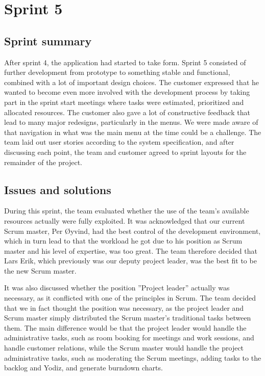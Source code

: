 \section{Sprint 5}
\subsection{Sprint summary}
After sprint 4, the application had started to take form. Sprint 5 consisted of further development from prototype to something stable and functional, combined with a lot of important design choices. The customer expressed that he wanted to become even more involved with the development process by taking part in the sprint start meetings where tasks were estimated, prioritized and allocated resources. The customer also gave a lot of constructive feedback that lead to many major redesigns, particularly in the menus. We were made aware of that navigation in what was the main menu at the time could be a challenge. The team laid out user stories according to the system specification, and after discussing each point, the team and customer agreed to sprint layouts for the remainder of the project.




\subsection{Issues and solutions}
\label{sec:unbalancedWorkload}
During this sprint, the team evaluated whether the use of the team's available resources actually were fully exploited. It was acknowledged that our current Scrum master, Per Øyvind, had the best control of the development environment, which in turn lead to that the workload he got due to his position as Scrum master and his level of expertise, was too great. The team therefore decided that Lars Erik, which previously was our deputy project leader, was the best fit to be the new Scrum master.

It was also discussed whether the position ''Project leader'' actually was necessary, as it conflicted with one of the principles in Scrum. The team decided that we in fact thought the position was necessary, as the project leader and Scrum master simply distributed the Scrum master's traditional tasks between them. The main difference would be that the project leader would handle the administrative tasks, such as room booking for meetings and work sessions, and handle customer relations, while the Scrum master would handle the project administrative tasks, such as moderating the Scrum meetings, adding tasks to the backlog and Yodiz, and generate burndown charts.

